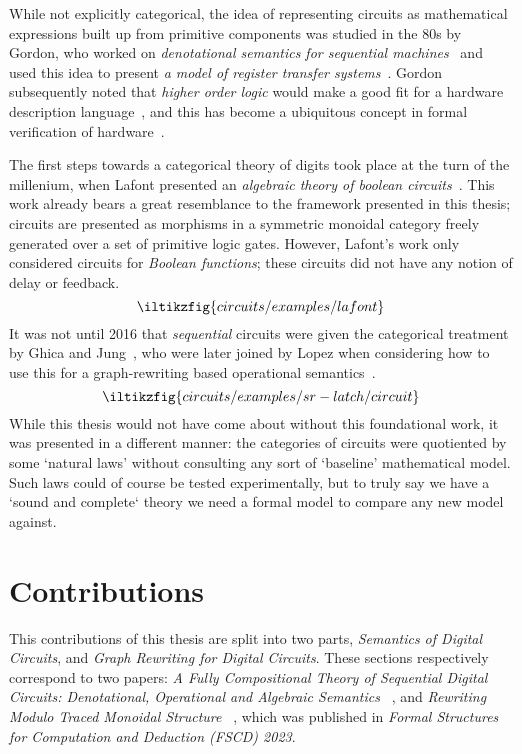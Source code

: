 While not explicitly categorical, the idea of representing circuits as
mathematical expressions built up from primitive components was studied in the
80s by Gordon, who worked on
\emph{denotational semantics for sequential machines}~\cite{gordon1980denotational}
and used this idea to present
\emph{a model of register transfer systems}~\cite{gordon1982model}.
Gordon subsequently noted that \emph{higher order logic} would make a good fit
for a hardware description language~\cite{gordon1985why}, and this has become
a ubiquitous concept in formal verification of hardware~\cite{gupta1992formal}.

The first steps towards a categorical theory of digits took place at the turn of
the millenium, when Lafont presented an
\emph{algebraic theory of boolean circuits}~\cite{lafont2003algebraic}.
This work already bears a great resemblance to the framework presented in this
thesis; circuits
are presented as morphisms in a symmetric monoidal category freely generated
over a set of primitive logic gates.
However, Lafont's work only considered circuits for \emph{Boolean functions};
these circuits did not have any notion of delay or feedback.
\[
    \iltikzfig{circuits/examples/lafont}
\]
It was not until 2016 that \emph{sequential} circuits were given the
categorical treatment by Ghica and Jung~\cite{ghica2016categorical}, who were
later joined by Lopez when considering how to use this for a graph-rewriting
based operational semantics~\cite{ghica2017diagrammatic}.
\[
    \iltikzfig{circuits/examples/sr-latch/circuit}
\]
While this thesis would not have come about without this foundational work, it
was presented in a different manner: the categories of circuits were quotiented
by some `natural laws' without consulting any sort of `baseline' mathematical
model.
Such laws could of course be tested experimentally, but to truly say we have a
`sound and complete` theory we need a formal model to compare any new model
against.


\section{Contributions}

This contributions of this thesis are split into two parts,
\emph{Semantics of Digital Circuits}, and
\emph{Graph Rewriting for Digital Circuits}.
These sections respectively correspond to two papers:
\emph{%
    A Fully Compositional Theory of Sequential Digital Circuits:
    Denotational, Operational and Algebraic Semantics%
}~\cite{ghica2024fully}, and \emph{%
    Rewriting Modulo Traced Monoidal Structure%
}~\cite{ghica2023rewriting}, which was published in
\emph{Formal Structures for Computation and Deduction (FSCD) 2023}.

